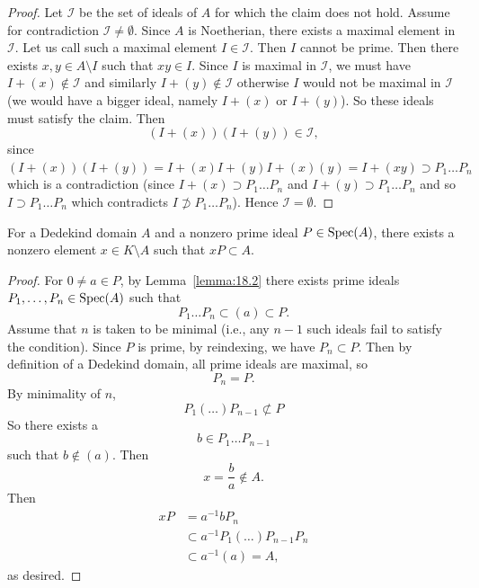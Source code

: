 \begin{proof}
Let $\mathcal{I}$ be the set of ideals of $A$ for which the claim does
not hold. Assume for contradiction $\mathcal{I}\neq\emptyset$.
Since $A$ is Noetherian, there exists a maximal element in
$\mathcal{I}$. Let us call such a maximal element
$I\in\mathcal{I}$. Then $I$ cannot be prime. Then there exists $x,y\in A\setminus I$
such that $xy\in I$. Since $I$ is maximal in $\mathcal{I}$, we must
have $I+(x)\notin\mathcal{I}$ and similarly $I+(y)\notin\mathcal{I}$
otherwise $I$ would not be maximal in $\mathcal{I}$ (we would have a
bigger ideal, namely $I+(x)$ or $I+(y)$).
So these ideals must satisfy the claim. Then
\begin{equation}
(I+(x))(I+(y))\in\mathcal{I},
\end{equation}
since $(I+(x))(I+(y))=I+(x)I+(y)I+(x)(y)=I+(xy)\supset P_{1}\dots P_{n}$ 
which is a contradiction (since $I+(x)\supset P_{1}\dots P_{n}$ and
$I+(y)\supset P_{1}\dots P_{n}$ and so $I\supset P_{1}\dots P_{n}$
which contradicts $I\nsupset P_{1}\dots P_{n}$). Hence $\mathcal{I}=\emptyset$.
\end{proof}

\begin{lemma}\label{lemma:18.3}
For a Dedekind domain $A$ and a nonzero prime ideal $P\in\operatorname{Spec}(A)$,
there exists a nonzero element $x\in K\setminus A$ such that
$xP\subset A$.
\end{lemma}

\begin{proof}
For $0\neq a\in P$, by Lemma~\ref{lemma:18.2} there exists prime
ideals $P_{1},\dots,P_{n}\in\operatorname{Spec}(A)$ such that
\begin{equation}
P_{1}\dots P_{n}\subset(a)\subset P.
\end{equation}
Assume that $n$ is taken to be minimal (i.e., any $n-1$ such ideals
fail to satisfy the condition). Since $P$ is prime, by reindexing, we
have $P_{n}\subset P$. Then by definition of a Dedekind domain, all
prime ideals are maximal, so
\begin{equation}
P_{n}=P.
\end{equation}
By minimality of $n$,
\begin{equation}
P_{1}(\dots)P_{n-1}\nsubset P
\end{equation}
So there exists a
\begin{equation}
b\in P_{1}\dots P_{n-1}
\end{equation}
such that $b\notin(a)$. Then
\begin{equation}
x=\frac{b}{a}\notin A.
\end{equation}
Then
\begin{subequations}
  \begin{align}
xP &= a^{-1}bP_{n}\\
&\subset a^{-1}P_{1}(\dots)P_{n-1}P_{n}\\
&\subset a^{-1}(a) = A,
  \end{align}
\end{subequations}
as desired.
\end{proof}

